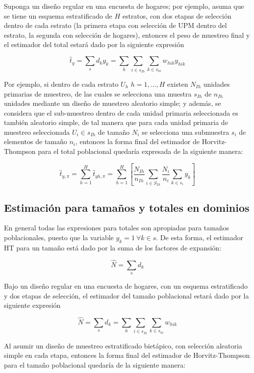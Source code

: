 \documentclass[
  12pt,
  spanish,
]{book}
\begin{document}
Suponga un diseño regular en una encuesta de hogares; por ejemplo, asuma que se tiene un esquema estratificado de \(H\) estratos, con dos etapas de selección dentro de cada estrato (la primera etapa con selección de UPM dentro del estrato, la segunda con selección de hogares), entonces el peso de muestreo final y el estimador del total estará dado por la siguiente expresión

\[
\hat{t}_y = \sum_s d_k y_k = \sum_h \sum_{i \in s_{Ih}} \sum_{k \in s_{hi}}  w_{hik} y_{hik}
\]

Por ejemplo, si dentro de cada estrato \(U_h\) \(h=1,\ldots, H\) existen \(N_{Ih}\) unidades primarias de muestreo, de las cuales se selecciona una muestra \(s_{Ih}\) de \(n_{Ih}\) unidades mediante un diseño de muestreo aleatorio simple; y además, se considera que el sub-muestreo dentro de cada unidad primaria seleccionada es también aleatorio simple, de tal manera que para cada unidad primaria de muestreo seleccionada \(U_i\in s_{Ih}\) de tamaño \(N_i\) se selecciona una submuestra \(s_i\) de elementos de tamaño \(n_i\), entonces la forma final del estimador de Horvitz-Thompson para el total poblacional quedaría expresada de la siguiente manera:

\[
\hat{t}_{y,\pi}=\sum_{h=1}^H\hat{t}_{yh,\pi}=\sum_{h=1}^H\left[\frac{N_{Ih}}{n_{Ih}}\sum_{i\in S_{Ih}}\frac{N_i}{n_i}\sum_{k\in s_i}y_k\right]
\]

\hypertarget{estimaciuxf3n-para-tamauxf1os-y-totales-en-dominios}{%
\subsection{Estimación para tamaños y totales en dominios}\label{estimaciuxf3n-para-tamauxf1os-y-totales-en-dominios}}

En general todas las expresiones para totales son apropiadas para tamaños poblacionales, puesto que la variable \(y_k = 1 \ \forall k \in s\). De esta forma, el estimador HT para un tamaño está dado por la suma de los factores de expansión:

\[
\hat{N} = \sum_s d_k 
\]

Bajo un diseño regular en una encuesta de hogares, con un esquema estratificado y dos etapas de selección, el estimador del tamaño poblacional estará dado por la siguiente expresión

\[
\hat{N} = \sum_s d_k = \sum_h \sum_{i \in s_{Ih}} \sum_{k \in s_{hi}}  w_{hik} 
\]

Al asumir un diseño de muestreo estratificado bietápico, con selección aleatoria simple en cada etapa, entonces la forma final del estimador de Horvitz-Thompson para el tamaño poblacional quedaría de la siguiente manera:
\end{document}
